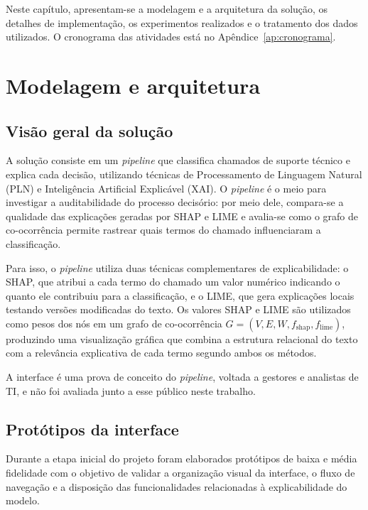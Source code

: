 \documentclass[
    12pt,                %
    openright,           %
    oneside,             %
    a4paper,             %
    english,             %
    brazil               %
]{abntex2}
\begin{document}
Neste capítulo, apresentam-se a modelagem e a arquitetura da solução, os detalhes 
de implementação, os experimentos realizados e o tratamento dos dados utilizados. 
O cronograma das atividades está no Apêndice~\ref{ap:cronograma}.

\section{Modelagem e arquitetura}
\label{sec:solucao}

\subsection{Visão geral da solução}

A solução consiste em um \textit{pipeline} que classifica chamados de 
suporte técnico e explica cada decisão, utilizando técnicas de 
Processamento de Linguagem Natural (PLN) e Inteligência Artificial 
Explicável (XAI). O \textit{pipeline} é o meio para investigar a 
auditabilidade do processo decisório: por meio dele, compara-se a 
qualidade das explicações geradas por SHAP e LIME e avalia-se como o 
grafo de co-ocorrência permite rastrear quais termos do chamado 
influenciaram a classificação.

Para isso, o \textit{pipeline} utiliza duas técnicas complementares de 
explicabilidade: o SHAP, que atribui a cada termo do chamado um 
valor numérico indicando o quanto ele contribuiu para a 
classificação, e o LIME, que gera explicações locais testando 
versões modificadas do texto. Os valores SHAP e LIME são utilizados como pesos dos nós 
em um grafo de co-ocorrência $G = (V, E, W, f_{\text{shap}}, f_{\text{lime}})$, 
produzindo uma visualização gráfica que combina a estrutura relacional do 
texto com a relevância explicativa de cada termo segundo ambos 
os métodos.

A interface é uma prova de conceito do \textit{pipeline}, voltada a 
gestores e analistas de TI, e não foi avaliada junto a esse público 
neste trabalho.

\subsection{Protótipos da interface}

Durante a etapa inicial do projeto foram elaborados protótipos de baixa e 
média fidelidade com o objetivo de validar a organização visual da interface, 
o fluxo de navegação e a disposição das funcionalidades relacionadas à 
explicabilidade do modelo.
\end{document}
